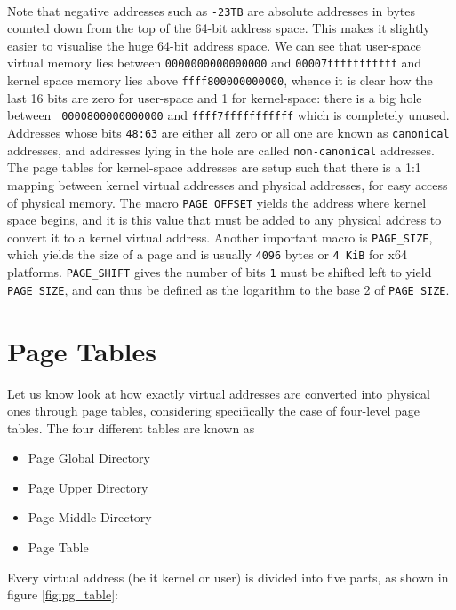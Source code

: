 \documentclass[a4paper,10pt]{article}
\begin{document}
\begin{flushleft}
~\\Note that negative addresses such as \verb|-23TB| are absolute addresses in bytes counted down from the top of the 64-bit address space.
This makes it slightly easier to visualise the huge 64-bit address space.
We can see that user-space virtual memory lies between \verb|0000000000000000| and \verb|00007fffffffffff| and kernel space memory lies above
\verb|ffff800000000000|, whence it is clear how the last 16 bits are zero for user-space and 1 for kernel-space: there is a big hole between 
\verb| 0000800000000000| and \verb|ffff7fffffffffff| which is completely unused. Addresses whose bits \verb|48:63| are either all zero or all one
are known as \verb|canonical| addresses, and addresses lying in the hole are called \verb|non-canonical| addresses.\\
The page tables for kernel-space addresses are setup such that there is a 1:1 mapping between kernel virtual addresses and physical addresses, for
easy access of physical memory.
The macro \verb|PAGE_OFFSET| yields the address where kernel space begins, and it is this value that must be added to any physical address
to convert it to a kernel virtual address. Another important macro is \verb|PAGE_SIZE|, which yields the size of a page and is usually \verb|4096|
bytes or \verb|4 KiB| for x64 platforms. \verb|PAGE_SHIFT| gives the number of bits \verb|1| must be shifted left to yield \verb|PAGE_SIZE|, and
can thus be defined as the logarithm to the base 2 of \verb|PAGE_SIZE|.

\section{Page Tables}

Let us know look at how exactly virtual addresses are converted into physical ones through page tables, considering specifically the case of
four-level page tables. The four different tables are known as

\begin{itemize}
 \item Page Global Directory
 \item Page Upper Directory
 \item Page Middle Directory
 \item Page Table
\end{itemize}

Every virtual address (be it kernel or user) is divided into five parts, as  shown  in figure \ref{fig:pg_table}:


\end{flushleft}
\end{document}
